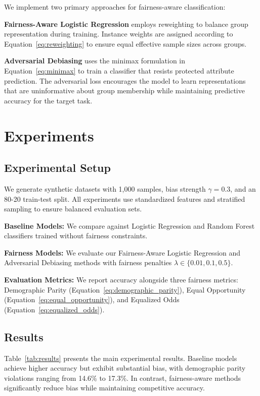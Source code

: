 \documentclass{article}
\begin{document}
We implement two primary approaches for fairness-aware classification:

\textbf{Fairness-Aware Logistic Regression} employs reweighting to balance group representation during training. Instance weights are assigned according to Equation~\ref{eq:reweighting} to ensure equal effective sample sizes across groups.

\textbf{Adversarial Debiasing} uses the minimax formulation in Equation~\ref{eq:minimax} to train a classifier that resists protected attribute prediction. The adversarial loss encourages the model to learn representations that are uninformative about group membership while maintaining predictive accuracy for the target task.

\section{Experiments}

\subsection{Experimental Setup}

We generate synthetic datasets with 1,000 samples, bias strength $\gamma = 0.3$, and an 80-20 train-test split. All experiments use standardized features and stratified sampling to ensure balanced evaluation sets.

\textbf{Baseline Models:} We compare against Logistic Regression and Random Forest classifiers trained without fairness constraints.

\textbf{Fairness Models:} We evaluate our Fairness-Aware Logistic Regression and Adversarial Debiasing methods with fairness penalties $\lambda \in \{0.01, 0.1, 0.5\}$.

\textbf{Evaluation Metrics:} We report accuracy alongside three fairness metrics: Demographic Parity (Equation~\ref{eq:demographic_parity}), Equal Opportunity (Equation~\ref{eq:equal_opportunity}), and Equalized Odds (Equation~\ref{eq:equalized_odds}).

\subsection{Results}

Table~\ref{tab:results} presents the main experimental results. Baseline models achieve higher accuracy but exhibit substantial bias, with demographic parity violations ranging from 14.6\% to 17.3\%. In contrast, fairness-aware methods significantly reduce bias while maintaining competitive accuracy.
\end{document}
